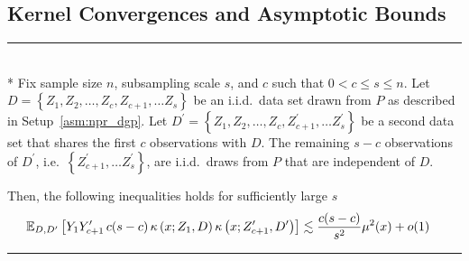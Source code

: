 \subsection{Kernel Convergences and Asymptotic Bounds}
\hrule

\begin{lem}\label{lem:npr_kern_ineq1}\mbox{}\\*
	Fix sample size $n$, subsampling scale $s$, and $c$ such that $0 < c \leq s \leq n$.
	Let $D = \left\{Z_1, Z_2, \dotsc, Z_c, Z_{c+1}, \dotsc Z_s \right\}$ be an i.i.d.\ data set drawn from $P$ as described in Setup~\ref{asm:npr_dgp}.
	Let $D^{\prime} = \left\{Z_1, Z_2, \dotsc, Z_c, Z_{c+1}^{\prime}, \dotsc Z_s^{\prime} \right\}$ be a second data set that shares the first $c$ observations with $D$.
	The remaining $s - c$ observations of $D^{\prime}$, i.e.\ $\left\{Z_{c+1}^{\prime}, \dotsc Z_s^{\prime} \right\}$, are i.i.d.\ draws from $P$ that are independent of $D$.

	Then, the following inequalities holds for sufficiently large $s$
	\begin{equation}
		\begin{aligned}
			\mathbb{E}_{D, D^{\prime}}\left[Y_{1}Y_{c+1}^{\prime} \, c(s-c) \, \kappa\left(x; Z_{1}, D\right)\kappa\left(x; Z_{c+1}^{\prime}, D^{\prime}\right)\right]
			& \lesssim  \frac{c(s-c)}{s^2}\mu^2(x) + o(1) 	
		\end{aligned}
	\end{equation}
\end{lem}

\hrule

